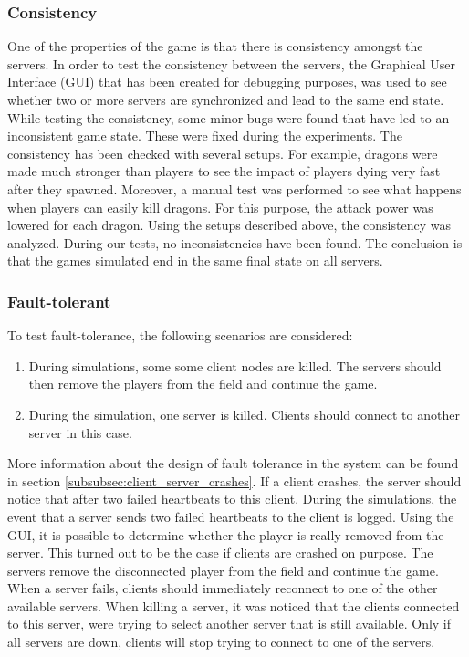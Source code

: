 	\subsubsection{Consistency}
	\label{subsubsec:consistency}
		One of the properties of the game is that there is consistency amongst the servers.
		In order to test the consistency between the servers, the Graphical User Interface (GUI) that has been created for debugging purposes, was used to see whether two or more servers are synchronized and lead to the same end state.
		While testing the consistency, some minor bugs were found that have led to an inconsistent game state. These were fixed during the experiments.
		The consistency has been checked with several setups. For example, dragons were made much stronger than players to see the impact of players dying very fast after they spawned.
		Moreover, a manual test was performed to see what happens when players can easily kill dragons. For this purpose, the attack power was lowered for each dragon.
		Using the setups described above, the consistency was analyzed. During our tests, no inconsistencies have been found. The conclusion is that the games simulated end in the same final state on all servers.
		
	\subsubsection{Fault-tolerant}
	\label{subsubsec:fault-tolerant}
		To test fault-tolerance, the following scenarios are considered:
		\begin{enumerate}
			\item During simulations, some some client nodes are killed. The servers should then remove the players from the field and continue the game.
			\item During the simulation, one server is killed. Clients should connect to another server in this case.
		\end{enumerate}
		
		More information about the design of fault tolerance in the system can be found in section \ref{subsubsec:client_server_crashes}. If a client crashes, the server should notice that after two failed heartbeats to this client. During the simulations, the event that a server sends two failed heartbeats to the client is logged. Using the GUI, it is possible to determine whether the player is really removed from the server. This turned out to be the case if clients are crashed on purpose. The servers remove the disconnected player from the field and continue the game.\\
		When a server fails, clients should immediately reconnect to one of the other available servers. When killing a server, it was noticed that the clients connected to this server, were trying to select another server that is still available. Only if all servers are down, clients will stop trying to connect to one of the servers.
		

